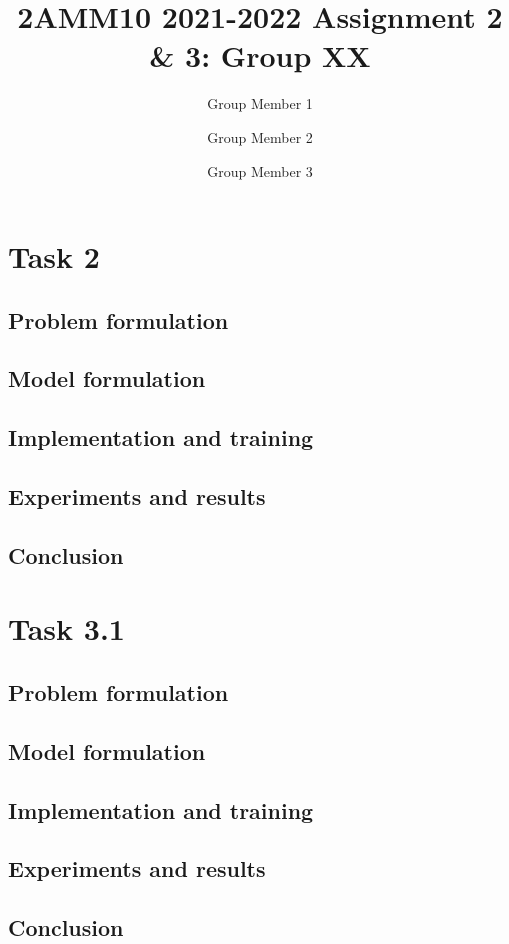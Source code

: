 \documentclass{article}
\title{2AMM10 2021-2022 Assignment 2 \& 3: Group XX}
\author{Group Member 1 \and Group Member 2 \and Group Member 3}
\begin{document}
\maketitle

\section{Task \textbf{2}}
\subsection{Problem formulation}
\subsection{Model formulation}
\subsection{Implementation and training}
\subsection{Experiments and results}
\subsection{Conclusion}

\section{Task \textbf{3.1}}
\subsection{Problem formulation}
\subsection{Model formulation}
\subsection{Implementation and training}
\subsection{Experiments and results}
\subsection{Conclusion}
\end{document}
